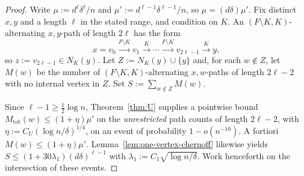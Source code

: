 \documentclass[11pt]{article}
\begin{document}
\begin{proof}
Write \(\mu:=d^\ell\delta^\ell/n\) and \(\mu':=d^{\ell-1}\delta^{\ell-1}/n\), so
\(\mu=(d\delta)\mu'\).
Fix distinct \(x,y\) and a length \(\ell\) in the stated range, and condition on
\(K\).
An \((F\setminus K,K)\)-alternating \(x,y\)-path of length \(2\ell\) has the form
\[
x=v_0\overset{F\setminus K}{\longrightarrow}v_1\overset{K}{\longrightarrow}
\cdots\overset{F\setminus K}{\longrightarrow}v_{2\ell-1}\overset{K}{\longrightarrow}y,
\]
so \(z:=v_{2\ell-1}\in N_K(y)\).
Let \(Z:=N_K(y)\cup\{y\}\) and, for each \(w\notin Z\), let \(M(w)\) be the number of
\((F\setminus K,K)\)-alternating \(x,w\)-paths of length \(2\ell-2\) with no internal
vertex in \(Z\).
Set \(S:=\sum_{w\notin Z}M(w)\).

Since \(\ell-1\ge\tfrac12\log n\), Theorem~\ref{thm:U} supplies a pointwise bound
\(M_{\mathrm{tot}}(w)\le(1+\eta)\mu'\) on the \emph{unrestricted} path counts of
length \(2\ell-2\), with \(\eta:=C_U(\log n/\delta)^{1/4}\), on an event of
probability \(1-o(n^{-10})\).
A fortiori \(M(w)\le(1+\eta)\mu'\).
Lemma~\ref{lem:one-vertex-chernoff} likewise yields
\(S\le(1+30\lambda_1)(d\delta)^{\ell-1}\) with
\(\lambda_1:=C_1\sqrt{\log n/\delta}\).
Work henceforth on the intersection of these events.


\end{proof}
\end{document}
